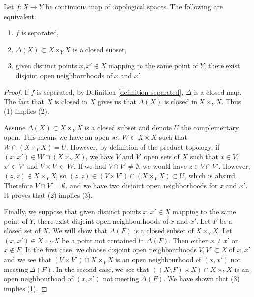 \begin{lemma}
\label{lemma-separated}
Let $f : X \to Y$ be continuous map of topological spaces.
The following are equivalent:
\begin{enumerate}
\item $f$ is separated,
\item $\Delta(X) \subset X \times_Y X$ is a closed subset,
\item given distinct points $x, x' \in X$ mapping to the same point of
$Y$, there exist disjoint open neighbourhoods of $x$ and $x'$.
\end{enumerate}
\end{lemma}

\begin{proof}
If $f$ is separated, by Definition \ref{definition-separated}, $\Delta$ is a
closed map. The fact that $X$ is closed in $X$ gives us that $\Delta(X)$ is
closed in $ X\times_Y X $. Thus (1) implies (2).

\medskip\noindent
Assune $\Delta(X) \subset X \times_Y X$ is a closed subset and denote
$U$ the complementary open. This means we have an open set
$W \subset X \times X$ such that $W \cap (X \times_Y X) = U$. However,
by definition of the product topology, if
$(x, x') \in W \cap (X \times_Y X)$,
we have $V$ and $V'$ open sets of $X$ such that $x \in V$, $x' \in V'$ and
$V \times V' \subset W$. If we had $V \cap V' \neq \emptyset$, we would have
$z \in V \cap V'$. However, $(z, z) \in X \times_Y X$, so
$(z,z) \in (V \times V') \cap (X\times_Y X) \subset U$, which is absurd.
Therefore $V \cap V' = \emptyset $, and we have two disjoint open
neighborhoods for $x$ and $x'$. It proves that (2) implies (3).

\medskip\noindent
Finally, we suppose that given distinct points $x, x' \in X$ mapping to
the same point of $Y$, there exist disjoint open neighbourhoods
of $x$ and $x'$. Let $F$ be a closed set of $X$. We will show that
$\Delta(F)$ is a closed subset of $X \times_Y X$. Let
$(x, x') \in X \times_Y X$ be a point not contained in $\Delta(F)$.
Then either $x \not = x'$ or $x \not \in F$.
In the first case, we choose disjoint open neighbourhoods
$V, V' \subset X$ of $x, x'$ and we see that $(V \times V') \cap X \times_Y X$
is an open neighbourhood of $(x, x')$ not meeting $\Delta(F)$.
In the second case, we see that $((X \setminus F) \times X) \cap X \times_Y X$
is an open neighbourhood of $(x, x')$ not meeting $\Delta(F)$.
We have shown that (3) implies (1).
\end{proof}

